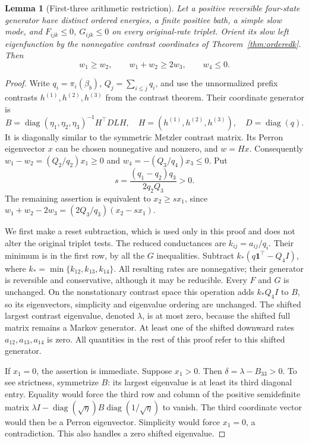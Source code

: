 \documentclass[11pt]{article}
\newtheorem{lemma}{Lemma}
\begin{document}
\begin{lemma}[First-three arithmetic restriction]\label{lem:firstthreearithmetic}
Let a positive reversible four-state generator have distinct ordered
energies, a finite positive bath, a simple slow mode, and $F_{ijk}\leq0$,
$G_{ijk}\leq0$ on every original-rate triplet. Orient its slow left
eigenfunction by the nonnegative contrast coordinates of
Theorem~\ref{thm:orderedk}. Then
\[
w_1\geq w_2,\qquad w_1+w_2\geq2w_3,\qquad w_4\leq0.
\]
\end{lemma}
\begin{proof}
Write $q_i=\pi_i(\beta_b)$, $Q_j=\sum_{i\leq j}q_i$, and use the
unnormalized prefix contrasts $h^{(1)},h^{(2)},h^{(3)}$ from the contrast
theorem. Their coordinate generator is
\[
B=\operatorname{diag}(\eta_1,\eta_2,\eta_3)^{-1}H^\top D L H,
\quad H=(h^{(1)},h^{(2)},h^{(3)}),\quad D=\operatorname{diag}(q).
\]
It is diagonally similar to the symmetric Metzler contrast matrix. Its
Perron eigenvector $x$ can be chosen nonnegative and nonzero, and $w=Hx$.
Consequently $w_1-w_2=(Q_2/q_2)x_1\geq0$ and
$w_4=-(Q_3/q_4)x_3\leq0$. Put
\[
s=\frac{(q_1-q_2)q_3}{2q_2Q_3}>0.
\]
The remaining assertion is equivalent to $x_2\geq sx_1$, since
$w_1+w_2-2w_3=(2Q_3/q_3)(x_2-sx_1)$.

We first make a reset subtraction, which is used only in this proof and
does not alter the original triplet tests. The reduced conductances are
$k_{ij}=a_{ij}/q_i$. Their minimum is in the first row, by all the $G$
inequalities. Subtract
$k_* (q\mathbf1^\top-Q_4 I)$, where
$k_* =\min\{k_{12},k_{13},k_{14}\}$.
All resulting rates are nonnegative; their generator is reversible and
conservative, although it may be reducible. Every $F$ and $G$ is unchanged.
On the nonstationary contrast space this operation adds $k_*Q_4I$ to $B$,
so its eigenvectors, simplicity and eigenvalue ordering are unchanged.
The shifted largest contrast eigenvalue, denoted $\lambda$, is at most zero,
because the shifted full matrix remains a Markov generator. At least one
of the shifted downward rates $a_{12},a_{13},a_{14}$ is zero. All quantities
in the rest of this proof refer to this shifted generator.

If $x_1=0$, the assertion is immediate. Suppose $x_1>0$. Then
$\delta=\lambda-B_{33}>0$. To see strictness, symmetrize $B$: its largest
eigenvalue is at least its third diagonal entry. Equality would force the
third row and column of the positive semidefinite matrix
$\lambda I-\operatorname{diag}(\sqrt\eta)B
\operatorname{diag}(1/\sqrt\eta)$ to vanish. The third coordinate vector
would then be a Perron eigenvector. Simplicity would force $x_1=0$, a
contradiction. This also handles a zero shifted eigenvalue.


\end{proof}
\end{document}

